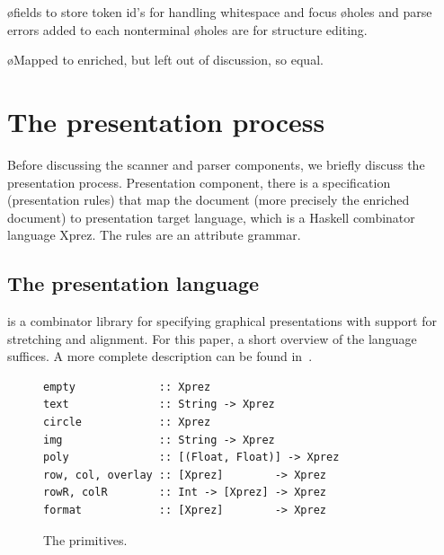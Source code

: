 \documentclass[12pt]{article}
\begin{document}
\bl
\o fields to store token id's for handling whitespace and focus
\o holes and parse errors added to each nonterminal
\o holes are for structure editing.
\el


\bl
\o Mapped to enriched, but left out of discussion, so equal.
\el

\section{The presentation process}

Before discussing the scanner and parser components, we briefly discuss the presentation process. Presentation component, there is a specification (presentation rules) that map the document (more precisely the enriched document) to presentation target language, which is a Haskell combinator language Xprez. The rules are an attribute grammar.

%
\subsection{The {\Xprez} presentation language} \label{sect:xprez}
%

\Xprez is a combinator library for specifying graphical presentations with support for stretching and alignment. For this paper, a short overview of the language suffices. A more complete description can be found in~\cite{schrage04Proxima}.

\begin{figure}
\begin{footnotesize}
\begin{center}
\begin{footnotesize}
\begin{verbatim}
empty             :: Xprez
text              :: String -> Xprez             
circle            :: Xprez                       
img               :: String -> Xprez             
poly              :: [(Float, Float)] -> Xprez 
row, col, overlay :: [Xprez]        -> Xprez          
rowR, colR        :: Int -> [Xprez] -> Xprez   
format            :: [Xprez]        -> Xprez
\end{verbatim}
\end{footnotesize}
\caption{The {\Xprez} primitives.} \label{fig:xprezPrim} 
\end{center}
\end{footnotesize}
\end{figure}
\end{document}
